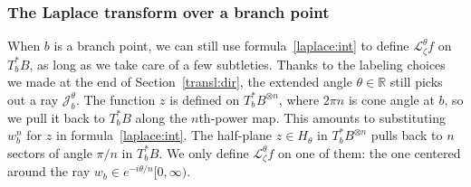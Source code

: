 \documentclass{article}
\newcommand{\maps}{\colon}
\newcommand{\R}{\mathbb{R}}
\newcommand{\C}{\mathbb{C}}
\newcommand{\laplace}{\mathcal{L}}
\newcommand{\borel}{\mathcal{B}}
\theoremstyle{definition}
\theoremstyle{plain}
\begin{document}
\subsubsection{The Laplace transform over a branch point}
When $b$ is a branch point, we can still use formula~\eqref{laplace:int} to define $\laplace_\zeta^\theta f$ on $T_b^*B$, as long as we take care of a few subtleties. Thanks to the labeling choices we made at the end of Section~\ref{transl:dir}, the extended angle $\theta \in \R$ still picks out a ray $\mathcal{J}_b^\theta$. The function $z$ is defined on $T_b^*B^{\otimes n}$, where $2\pi n$ is cone angle at $b$, so we pull it back to $T^*_bB$ along the $n$th-power map. This amounts to substituting $w_b^n$ for $z$ in formula~\eqref{laplace:int}. The half-plane $z \in H_{\theta}$ in $T_b^*B^{\otimes n}$ pulls back to $n$ sectors of angle $\pi/n$ in $T_b^*B$. We only define $\laplace_\zeta^\theta f$ on one of them: the one centered around the ray $w_b \in e^{-i\theta/n}[0, \infty)$.
\end{document}
